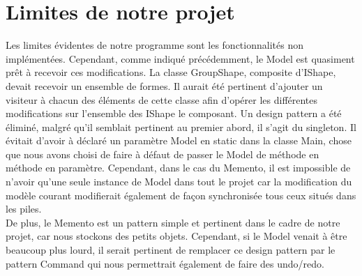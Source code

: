 \chapter{Limites de notre projet}

Les limites évidentes de notre programme sont les fonctionnalités non implémentées. 
Cependant, comme indiqué précédemment, le Model est quasiment prêt à recevoir
ces modifications. La classe GroupShape, composite d'IShape,
devait recevoir un ensemble de formes. Il aurait été pertinent d'ajouter un visiteur à chacun des éléments de cette classe afin d'opérer les différentes
modifications sur l'ensemble des IShape le composant. Un design pattern a été éliminé, malgré qu'il semblait pertinent au premier abord, il s'agit du singleton.
Il évitait d'avoir à déclaré un paramètre Model en static dans la classe Main, chose que nous avons choisi de faire à défaut de passer le Model de méthode
en méthode en paramètre. Cependant, dans le cas du Memento, il est impossible
de n'avoir qu'une seule instance de Model dans tout le projet car la modification
du modèle courant modifierait également de façon synchronisée tous ceux situés dans les piles.
\\
De plus, le Memento est un pattern simple et pertinent dans le cadre de notre projet, car nous stockons des petits objets. Cependant, si le Model
venait à être beaucoup plus lourd, il serait pertinent de remplacer ce design
pattern par le pattern Command qui nous permettrait également de faire des
undo/redo.
